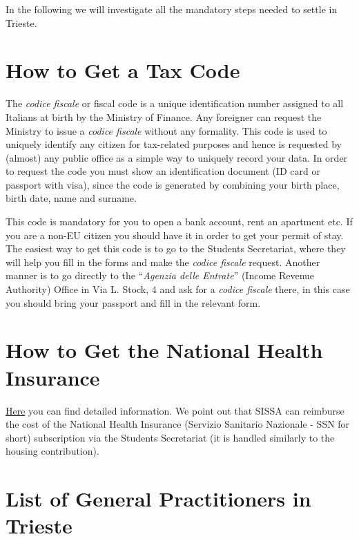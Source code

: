 \documentclass{sissavademecum}
\begin{document}
In the following we will investigate all the mandatory steps needed to settle in Trieste.


\section{How to Get a Tax Code}

The \textit{codice fiscale} or fiscal code is a unique identification number assigned to all Italians at birth by the Ministry of Finance. Any foreigner can request the Ministry to issue a \textit{codice fiscale} without any formality. This code is used to uniquely identify any citizen for tax-related purposes and hence is requested by (almost) any public office as a simple way to uniquely record your data. In order to request the code you must show an identification document (ID card or passport with visa), since the code is generated by combining your birth place, birth date, name and surname.

This code is mandatory for you to open a bank account, rent an apartment etc. If you are a non-EU citizen you should have it in order to get your permit of stay. The easiest way to get this code is to go to the Students Secretariat, where they will help you fill in the forms and make the \textit{codice fiscale} request. Another manner is to go directly to the ``\textit{Agenzia delle Entrate}'' (Income Revenue Authority) Office in Via L. Stock, 4 and ask for a \textit{codice fiscale} there, in this case you should bring your passport and fill in the relevant form.


\section{How to Get the National Health Insurance}

\href{http://wiki.sissa.it/students/index.php/Health_Insurance}{Here} you can find detailed information. We point out that SISSA can reimburse the cost of the National Health Insurance (Servizio Sanitario Nazionale - SSN for short) subscription via the Students Secretariat (it is handled similarly to the housing contribution).


\section{List of General Practitioners in Trieste}
\end{document}
